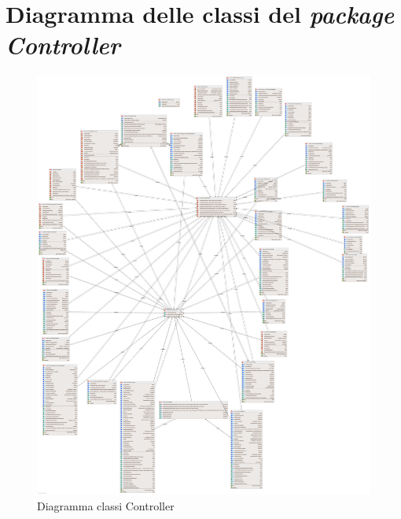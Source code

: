 \documentclass[a4paper,11pt]{report}
\begin{document}
\section{Diagramma delle classi del \textit{package Controller}}
\begin{figure}[h!]
	\centering
	    \hspace*{-0.2in}
	\includegraphics[width=1.15\linewidth]{Class diagrams/Package Controller.png}
	\caption{Diagramma classi Controller}
\end{figure}

\clearpage
\end{document}
